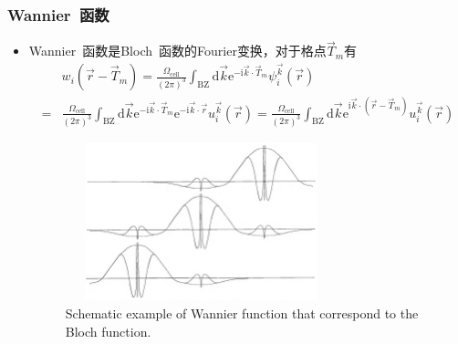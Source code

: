 \frame
{
	\frametitle{\textrm{Wannier~}函数}
	\begin{itemize}
		\item \textrm{Wannier~}函数是\textrm{Bloch~}函数的\textrm{Fourier}变换，对于格点$\vec T_m$有
			\begin{displaymath}
				\begin{aligned}
					&w_i(\vec r-\vec T_m)=\frac{\Omega_{\mathrm{cell}}}{(2\pi)^3}\int_{\mathrm{BZ}}\mathrm{d}\vec k\mathrm{e}^{-\mathrm{i}\vec k\cdot\vec T_m}\psi_i^{\vec k}(\vec r)\\
					=&\frac{\Omega_{\mathrm{cell}}}{(2\pi)^3}\int_{\mathrm{BZ}}\mathrm{d}\vec k\mathrm{e}^{-\mathrm{i}\vec k\cdot\vec T_m}\mathrm{e}^{-\mathrm{i}\vec k\cdot\vec r}u_i^{\vec k}(\vec r)=\frac{\Omega_{\mathrm{cell}}}{(2\pi)^3}\int_{\mathrm{BZ}}\mathrm{d}\vec k\mathrm{e}^{\mathrm{i}\vec k\cdot(\vec r-\vec T_m)}u_i^{\vec k}(\vec r)
				\end{aligned}
			\end{displaymath}
\begin{figure}[h!]
\centering
\vspace*{-0.6in}
\includegraphics[height=1.8in,width=3.1in,viewport=0 0 1400 1000,clip]{Figures/Wannier_function.png}
\caption{\tiny \textrm{Schematic example of Wannier function that correspond to the Bloch function.}}%
\label{Wannier-function}
\end{figure} 
	\end{itemize}
}

